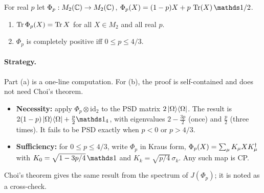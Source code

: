 \documentclass[11pt]{article}
\begin{document}
\begin{theorem}\label{thm:main}
For real $p$ let $\Phi_p:M_2(\mathbb{C})\to M_2(\mathbb{C})$, $\Phi_p(X)=(1-p)X+p\,\Tr(X)\,\id/2$.
\begin{enumerate}
  \item[(a)] $\operatorname{Tr}\Phi_p(X)=\operatorname{Tr} X$ for all $X\in M_2$ and all real $p$.
  \item[(b)] $\Phi_p$ is completely positive iff $0\le p\le 4/3$.
\end{enumerate}
\end{theorem}

\paragraph{Strategy.} Part (a) is a one-line computation. For (b), the proof is self-contained
and does not need Choi's theorem.
\begin{itemize}
  \item \textbf{Necessity:} apply $\Phi_p\otimes\mathrm{id}_2$ to the PSD matrix
    $2\left\lvert \Omega \right\rangle\!\left\langle \Omega \right\rvert$. The result is $2(1-p)\proj{\Omega}+\tfrac p2 \id_4$, with eigenvalues
    $2-\tfrac{3p}{2}$ (once) and $\tfrac p2$ (three times). It fails to be PSD exactly when $p<0$
    or $p>4/3$.
  \item \textbf{Sufficiency:} for $0\le p\le4/3$, write $\Phi_p$ in Kraus form,
    $\Phi_p(X)=\sum_\mu K_\mu XK_\mu^{\dagger}$ with $K_0=\sqrt{1-3p/4}\,\id$ and
    $K_k=\sqrt{p/4}\,\sigma_k$. Any such map is CP.
\end{itemize}
Choi's theorem gives the same result from the spectrum of $J(\Phi_p)$; it is noted as a
cross-check.
\end{document}
